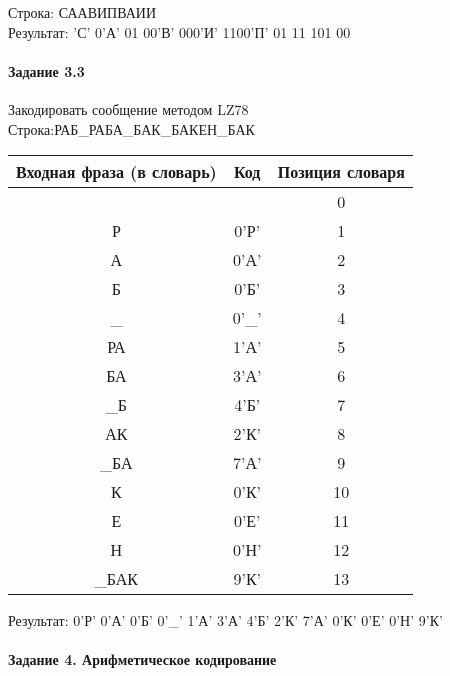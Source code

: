 \documentclass[a4paper, 12pt]{article}
\begin{document}
Строка: 
СААВИПВАИИ\\
Результат: 'С' 0'А' 01 00'В' 000'И' 1100'П' 01 11 101 00










\pagebreak

\paragraph{Задание 3.3}

Закодировать сообщение методом LZ78\\
Строка:РАБ\_РАБА\_БАК\_БАКЕН\_БАК\\
\begin{table}[h!]
\centering
\begin{tabular}{|c|c|c|} 
\hline
 Входная фраза (в словарь) & Код & Позиция словаря \\ \hline

 &  & 0 \\ \hline
Р & 0'Р' & 1 \\ \hline
А & 0'А' & 2 \\ \hline
Б & 0'Б' & 3 \\ \hline
\_ & 0'\_' & 4 \\ \hline
РА & 1'А' & 5 \\ \hline
БА & 3'А' & 6 \\ \hline
\_Б & 4'Б' & 7 \\ \hline
АК & 2'К' & 8 \\ \hline
\_БА & 7'А' & 9 \\ \hline
К & 0'К' & 10 \\ \hline
Е & 0'Е' & 11 \\ \hline
Н & 0'Н' & 12 \\ \hline
\_БАК & 9'К' & 13 \\ \hline
\end{tabular}
\end{table}

Результат: 0'Р' 0'А' 0'Б' 0'\_' 1'А' 3'А' 4'Б' 2'К' 7'А' 0'К' 0'Е' 0'Н' 9'К'\\
\pagebreak
\paragraph{Задание 4. Арифметическое кодирование\\}
\end{document}
